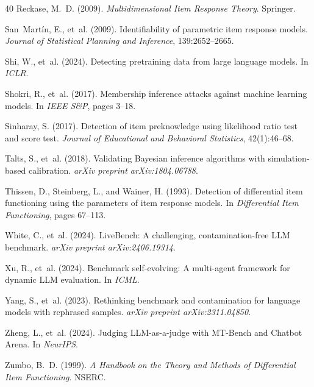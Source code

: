 \documentclass[11pt,a4paper]{article}
\begin{document}
\begin{thebibliography}{40}
Reckase, M.~D. (2009).
\newblock \emph{Multidimensional Item Response Theory}.
\newblock Springer.

San~Mart\'in, E., et~al. (2009).
\newblock Identifiability of parametric item response models.
\newblock \emph{Journal of Statistical Planning and Inference}, 139:2652--2665.

Shi, W., et~al. (2024).
\newblock Detecting pretraining data from large language models.
\newblock In \emph{ICLR}.

Shokri, R., et~al. (2017).
\newblock Membership inference attacks against machine learning models.
\newblock In \emph{IEEE S\&P}, pages 3--18.

Sinharay, S. (2017).
\newblock Detection of item preknowledge using likelihood ratio test and score test.
\newblock \emph{Journal of Educational and Behavioral Statistics}, 42(1):46--68.

Talts, S., et~al. (2018).
\newblock Validating Bayesian inference algorithms with simulation-based calibration.
\newblock \emph{arXiv preprint arXiv:1804.06788}.

Thissen, D., Steinberg, L., and Wainer, H. (1993).
\newblock Detection of differential item functioning using the parameters of item response models.
\newblock In \emph{Differential Item Functioning}, pages 67--113.

White, C., et~al. (2024).
\newblock LiveBench: A challenging, contamination-free LLM benchmark.
\newblock \emph{arXiv preprint arXiv:2406.19314}.

Xu, R., et~al. (2024).
\newblock Benchmark self-evolving: A multi-agent framework for dynamic LLM evaluation.
\newblock In \emph{ICML}.

Yang, S., et~al. (2023).
\newblock Rethinking benchmark and contamination for language models with rephrased samples.
\newblock \emph{arXiv preprint arXiv:2311.04850}.

Zheng, L., et~al. (2024).
\newblock Judging LLM-as-a-judge with MT-Bench and Chatbot Arena.
\newblock In \emph{NeurIPS}.

Zumbo, B.~D. (1999).
\newblock \emph{A Handbook on the Theory and Methods of Differential Item Functioning}.
\newblock NSERC.

\end{thebibliography}
\end{document}
